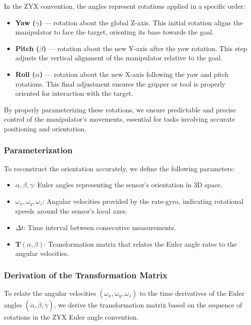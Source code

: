 \documentclass[12pt]{article}
\begin{document}
In the ZYX convention, the angles represent rotations applied in a specific order:
\begin{itemize}
    \item \textbf{Yaw (\(\gamma\))} — rotation about the global Z-axis. This initial rotation aligns the manipulator to face the target, orienting its base towards the goal.
    \item \textbf{Pitch (\(\beta\))} — rotation about the new Y-axis after the yaw rotation. This step adjusts the vertical alignment of the manipulator relative to the goal.
    \item \textbf{Roll (\(\alpha\))} — rotation about the new X-axis following the yaw and pitch rotations. This final adjustment ensures the gripper or tool is properly oriented for interaction with the target.
\end{itemize}

By properly parameterizing these rotations, we ensure predictable and precise control of the manipulator's movements, essential for tasks involving accurate positioning and orientation.

\subsubsection{Parameterization}
To reconstruct the orientation accurately, we define the following parameters:
\begin{itemize}
    \item \(\alpha, \beta, \gamma\): Euler angles representing the sensor's orientation in 3D space.
    \item \(\omega_x, \omega_y, \omega_z\): Angular velocities provided by the rate-gyro, indicating rotational speeds around the sensor’s local axes.
    \item \(\Delta t\): Time interval between consecutive measurements.
    \item \(\mathbf{T}(\alpha, \beta)\): Transformation matrix that relates the Euler angle rates to the angular velocities.
\end{itemize}

\subsubsection{Derivation of the Transformation Matrix}

To relate the angular velocities \((\omega_x, \omega_y, \omega_z)\) to the time derivatives of the Euler angles \((\dot{\alpha}, \dot{\beta}, \dot{\gamma})\), we derive the transformation matrix based on the sequence of rotations in the ZYX Euler angle convention.
\end{document}
